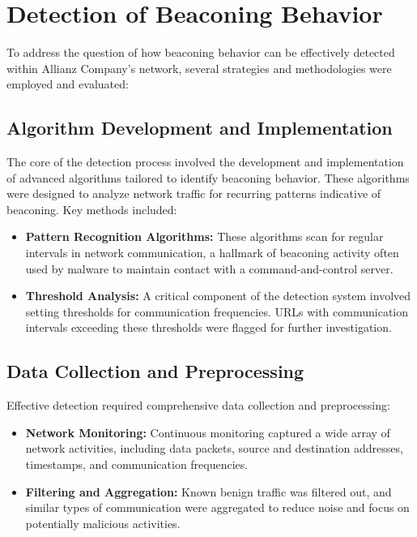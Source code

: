 \section{Detection of Beaconing Behavior}

To address the question of how beaconing behavior can be effectively detected within Allianz Company’s network, several strategies and methodologies were employed and evaluated:

\subsection{Algorithm Development and Implementation}

The core of the detection process involved the development and implementation of advanced algorithms tailored to identify beaconing behavior. These algorithms were designed to analyze network traffic for recurring patterns indicative of beaconing. Key methods included:

\begin{itemize}
    \item \textbf{Pattern Recognition Algorithms:} These algorithms scan for regular intervals in network communication, a hallmark of beaconing activity often used by malware to maintain contact with a command-and-control server.
    \item \textbf{Threshold Analysis:} A critical component of the detection system involved setting thresholds for communication frequencies. URLs with communication intervals exceeding these thresholds were flagged for further investigation.
\end{itemize}

\subsection{Data Collection and Preprocessing}

Effective detection required comprehensive data collection and preprocessing:
\begin{itemize}
    \item \textbf{Network Monitoring:} Continuous monitoring captured a wide array of network activities, including data packets, source and destination addresses, timestamps, and communication frequencies.
    \item \textbf{Filtering and Aggregation:} Known benign traffic was filtered out, and similar types of communication were aggregated to reduce noise and focus on potentially malicious activities.
\end{itemize}


